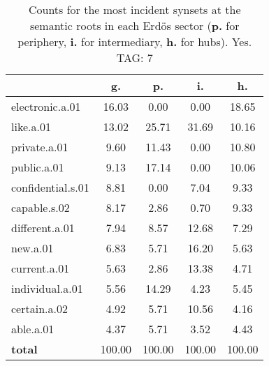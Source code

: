\begin{table}[h!]
\begin{center}
\begin{tabular}{| l || c | c | c | c |}\hline
 & {\bf g.} & {\bf p.} & {\bf i.} & {\bf h.} \\\hline\hline
electronic.a.01 & 16.03  & 0.00  & 0.00  & 18.65 \\\hline
like.a.01 & 13.02  & 25.71  & 31.69  & 10.16 \\\hline
private.a.01 & 9.60  & 11.43  & 0.00  & 10.80 \\\hline
public.a.01 & 9.13  & 17.14  & 0.00  & 10.06 \\\hline
confidential.s.01 & 8.81  & 0.00  & 7.04  & 9.33 \\\hline
capable.s.02 & 8.17  & 2.86  & 0.70  & 9.33 \\\hline
different.a.01 & 7.94  & 8.57  & 12.68  & 7.29 \\\hline
new.a.01 & 6.83  & 5.71  & 16.20  & 5.63 \\\hline
current.a.01 & 5.63  & 2.86  & 13.38  & 4.71 \\\hline
individual.a.01 & 5.56  & 14.29  & 4.23  & 5.45 \\\hline
certain.a.02 & 4.92  & 5.71  & 10.56  & 4.16 \\\hline
able.a.01 & 4.37  & 5.71  & 3.52  & 4.43 \\\hline\hline
{{\bf total}} & 100.00  & 100.00  & 100.00  & 100.00 \\\hline
\end{tabular}
\caption{Counts for the most incident synsets at the semantic roots in each Erd\"os sector ({\bf p.} for periphery, {\bf i.} for intermediary, {\bf h.} for hubs). Yes. TAG: 7}
\end{center}
\end{table}